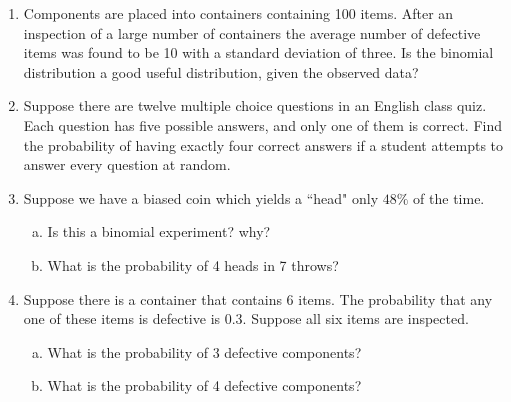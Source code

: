 \documentclass[a4paper,12pt]{article}
\begin{document}
\begin{enumerate}
\begin{enumerate}[(a)]
\begin{multicols}{2}
\begin{enumerate}[(i)]
	\item $X \sim Bin(n = 10, p = 0.40)$
	\item $X \sim Bin(n = 15, p = 0.25)$
	\item $X \sim Bin(n = 20, p = 0.30)$
	\item $X \sim Bin(n = 50, p = 0.20)$
	\item $X \sim Bin(n = 200, p = 0.10)$
	\item $X \sim Bin(n = 1000, p = 0.01)$
\end{enumerate}
\end{multicols}
\end{enumerate}

\item Components are placed into containers containing 100 items.
After an inspection of a large number of containers the average number of defective items was found to be 10 with a standard deviation of three.
Is the binomial distribution a good useful distribution, given the observed data?


	
\item Suppose there are twelve multiple choice questions in an English class quiz. Each question has five possible answers, and only one of them is correct. Find the probability of having exactly four correct answers if a student attempts to answer every question at random.	
	
	\item Suppose we have a biased coin which yields a ``head" only $48\%$ of the time.
\begin{enumerate}[(a)]
	

	\item Is this a binomial experiment?  why?
	\item What is the probability of 4 heads in 7 throws?

\end{enumerate}
\item Suppose there is a container that contains 6 items.  The probability that any one of these items is defective is 0.3. Suppose all six items are inspected. 
	\begin{enumerate}[(a)]
		\item What is the probability of 3 defective components?
		\item What is the probability of 4 defective components?
	\end{enumerate}
	

\end{enumerate}
\end{document}

